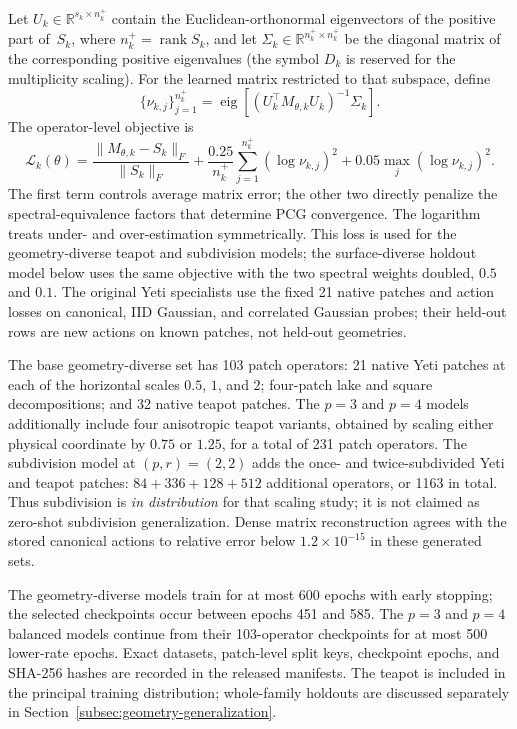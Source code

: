\documentclass{article}
\newcommand{\R}{\mathbb{R}}
\newcommand{\Sloc}[1]{S_{#1}}                    %
\newcommand{\Dmult}[1]{D_{#1}}                   %
\theoremstyle{plain}
\numberwithin{equation}{section}
\begin{document}
Let $U_k\in\R^{s_k\times n_k^+}$ contain the Euclidean-orthonormal eigenvectors
of the positive part of~$\Sloc{k}$, where $n_k^+=\operatorname{rank}\Sloc{k}$, and
let $\Sigma_k\in\R^{n_k^+\times n_k^+}$ be the diagonal matrix of the
corresponding positive eigenvalues (the symbol $\Dmult{k}$ is reserved for the
multiplicity scaling).
For the learned matrix restricted to that subspace, define
\[
    \{\nu_{k,j}\}_{j=1}^{n_k^+}
    =\operatorname{eig}\!\left[
        (U_k^\top M_{\theta,k}U_k)^{-1}\Sigma_k
        \right].
\]
The operator-level objective is
\begin{equation}
    \mathcal L_k(\theta)
    =\frac{\|M_{\theta,k}-\Sloc{k}\|_F}{\|\Sloc{k}\|_F}
    +\frac{0.25}{n_k^+}\sum_{j=1}^{n_k^+}(\log\nu_{k,j})^2
    +0.05\max_j(\log\nu_{k,j})^2.
    \label{eq:journal-operator-loss}
\end{equation}
The first term controls average matrix error; the other two directly penalize
the spectral-equivalence factors that determine PCG convergence.  The
logarithm treats under- and over-estimation symmetrically.  This loss is used
for the geometry-diverse teapot and subdivision models; the surface-diverse
holdout model below uses the same objective with the two spectral weights
doubled, $0.5$ and $0.1$.  The original Yeti
specialists use the fixed 21 native patches and action losses on canonical,
IID Gaussian, and correlated Gaussian probes; their held-out rows are new
actions on known patches, not held-out geometries.

The base geometry-diverse set has 103 patch operators: 21 native Yeti patches
at each of the horizontal scales $0.5$, $1$, and $2$; four-patch lake and
square decompositions; and 32 native teapot patches.  The $p=3$ and $p=4$
models additionally include four anisotropic teapot variants, obtained by
scaling either physical coordinate by $0.75$ or $1.25$, for a total of 231
patch operators.  The subdivision model at $(p,r)=(2,2)$ adds the once- and
twice-subdivided Yeti and teapot patches: $84+336+128+512$ additional
operators, or 1163 in total.  Thus subdivision is \emph{in distribution} for
that scaling study; it is not claimed as zero-shot subdivision
generalization.  Dense matrix reconstruction agrees with the stored canonical
actions to relative error below $1.2\times10^{-15}$ in these generated sets.

The geometry-diverse models train for at most 600 epochs with early stopping;
the selected checkpoints occur between epochs 451 and 585.  The $p=3$ and
$p=4$ balanced models continue from their 103-operator checkpoints for at most
500 lower-rate epochs.  Exact datasets, patch-level split keys, checkpoint
epochs, and SHA-256 hashes are recorded in the released manifests.  The
teapot is included in the principal training distribution; whole-family
holdouts are discussed separately in
Section~\ref{subsec:geometry-generalization}.
\end{document}
